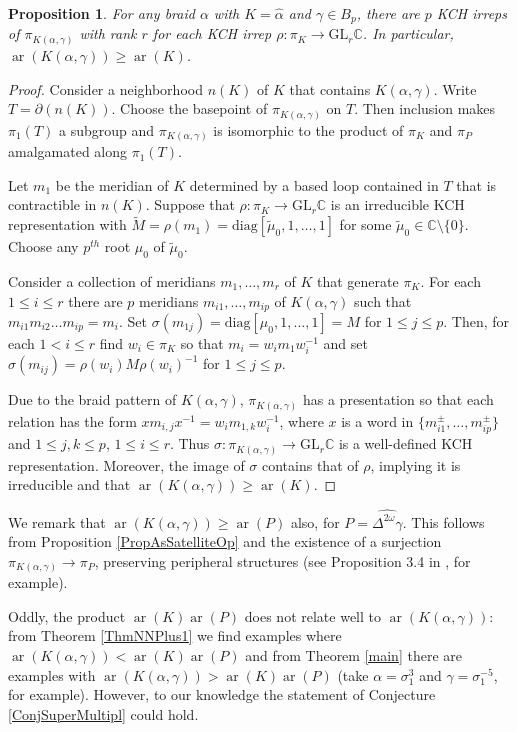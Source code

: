 \documentclass[11pt]{amsart}
\def\C{{\mathbb C}}
\def\s{{\sigma}}
\def\ar{\operatorname{ar}}
\newtheorem{prop}[thm]{Proposition}
\theoremstyle{definition}
\begin{document}
\begin{prop}For any braid $\alpha$ with $K=\hat{\alpha}$ and $\gamma\in B_p$, there are $p$ KCH irreps of $\pi_{K(\alpha,\gamma)}$ with rank $r$ for each KCH irrep $\rho:\pi_K\to\text{GL}_r\C$. In particular, $\ar(K(\alpha,\gamma)) \ge \ar(K)$.
\label{ThmCompanionRank}
\end{prop}
\begin{proof}Consider a neighborhood $n(K)$ of $K$ that contains $K(\alpha,\gamma)$. Write $T=\partial(n(K))$. Choose the basepoint of $\pi_{K(\alpha,\gamma)}$ on $T$. Then inclusion makes $\pi_1(T)$ a subgroup and $\pi_{K(\alpha,\gamma)}$ is isomorphic to the product of $\pi_K$ and $\pi_P$ amalgamated along $\pi_1(T)$.

Let $m_1$ be the meridian of $K$ determined by a based loop contained in $T$ that is contractible in $n(K)$. Suppose that $\rho:\pi_K\to\text{GL}_r\mathbb C$ is an irreducible KCH representation with $\widetilde M = \rho(m_1) = \text{diag}[\widetilde\mu_0,1,\ldots,1]$ for some $\widetilde\mu_0\in\mathbb C\setminus\{0\}$. Choose any $p^{th}$ root $\mu_0$ of $\widetilde\mu_0$. 

Consider a collection of meridians $m_1,\ldots,m_r$ of $K$ that generate $\pi_K$. For each $1\le i\le r$ there are $p$ meridians $m_{i1},\ldots,m_{ip}$ of $K(\alpha,\gamma)$ such that $m_{i1}m_{i2}\ldots m_{ip} = m_i$. Set $\s(m_{1j}) = \text{diag}[\mu_0,1,\ldots,1] = M$ for $1\le j\le p$. Then, for each $1< i\le r$ find $w_i\in\pi_K$ so that $m_i = w_im_1w_i^{-1}$ and set $\s(m_{ij}) = \rho(w_i)M\rho(w_i)^{-1}$ for $1\le j\le p$.

Due to the braid pattern of $K(\alpha,\gamma)$, $\pi_{K(\alpha,\gamma)}$ has a presentation so that each relation has the form $xm_{i,j}x^{-1} = w_im_{1,k}w_i^{-1}$, where $x$ is a word in $\{m_{i1}^{\pm},\ldots,m_{ip}^{\pm}\}$ and $1\le j, k\le p$, $1\le i\le r$. Thus $\s:\pi_{K(\alpha,\gamma)}\to\text{GL}_r\mathbb C$ is a well-defined KCH representation. Moreover, the image of $\s$ contains that of $\rho$, implying it is irreducible and that $\ar(K(\alpha,\gamma))\ge \ar(K)$.
\end{proof}

We remark that $\ar(K(\alpha,\gamma))\ge \ar(P)$ also, for $P=\widehat{\Delta^{2\omega}\gamma}$. This follows from Proposition \ref{PropAsSatelliteOp} and the existence of a surjection $\pi_{K(\alpha,\gamma)}\to\pi_P$, preserving peripheral structures (see Proposition 3.4 in \cite{SW}, for example). 

Oddly, the product $\ar(K)\ar(P)$ does not relate well to $\ar(K(\alpha,\gamma))$: from Theorem \ref{ThmNNPlus1} we find examples where $\ar(K(\alpha,\gamma))<\ar(K)\ar(P)$ and from Theorem \ref{main} there are examples with $\ar(K(\alpha,\gamma))>\ar(K)\ar(P)$ (take $\alpha=\s_1^3$ and $\gamma=\s_1^{-5}$, for example). However, to our knowledge the statement of Conjecture \ref{ConjSuperMultipl} could hold. 
\end{document}
